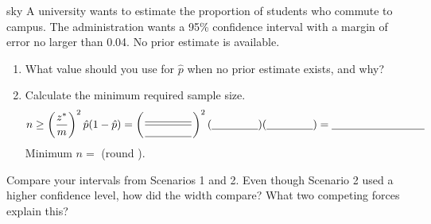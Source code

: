 \documentclass[10pt]{article}
\begin{document}
\begin{scenariobox}{sky}
A university wants to estimate the proportion of students who commute to campus. The
administration wants a 95\% confidence interval with a margin of error no larger than 0.04.
No prior estimate is available.

\begin{enumerate}[label=\alph*.]
  \item What value should you use for $\hat p$ when no prior estimate exists, and why?

  \item Calculate the minimum required sample size.
        \[n \ge \left(\frac{z^*}{m}\right)^2 \hat p(1-\hat p) = \left(\frac{\blank{1.5cm}}{\blank{1.5cm}}\right)^2 (\blank{1.5cm})(\blank{1.5cm}) = \blank{3cm}\]
        Minimum $n = $ \blank{2cm} (round \underline{\hspace{1.5cm}}).
\end{enumerate}
\end{scenariobox}

\begin{reflectionbox}
Compare your intervals from Scenarios 1 and 2. Even though Scenario 2 used a higher
confidence level, how did the width compare? What two competing forces explain this?
\end{reflectionbox}
\end{document}
